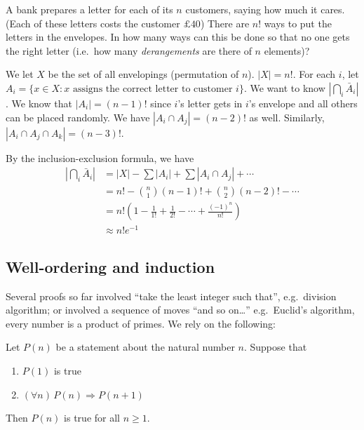 \documentclass[a4paper]{article}
\begin{document}
\begin{eg}
  A bank prepares a letter for each of its $n$ customers, saying how much it cares. (Each of these letters costs the customer $\pounds 40$) There are $n!$ ways to put the letters in the envelopes. In how many ways can this be done so that no one gets the right letter (i.e.\ how many \emph{derangements} are there of $n$ elements)?

  We let $X$ be the set of all envelopings (permutation of $n$). $|X| = n!$. For each $i$, let $A_i = \{x\in X: x \text{ assigns the correct letter to customer }i\}$. We want to know $|\bigcap_i \bar A_i|$. We know that $|A_i| = (n - 1)!$ since $i$'s letter gets in $i$'s envelope and all others can be placed randomly. We have $|A_i\cap A_j| = (n - 2)!$ as well. Similarly, $|A_i\cap A_j \cap A_k| = (n - 3)!$.

  By the inclusion-exclusion formula, we have
  \begin{align*}
    \left|\bigcap_i \bar A_i\right| &= |X| - \sum |A_i| + \sum |A_i\cap A_j| + \cdots\\
    &= n! - \binom{n}{1}(n - 1)! + \binom{n}{2}(n - 2)! - \cdots\\
    &= n!\left(1 - \frac{1}{1!} + \frac{1}{2!} - \cdots + \frac{(-1)^n}{n!}\right)\\
    &\approx n! e^{-1}
  \end{align*}
\end{eg}
\subsection{Well-ordering and induction}
Several proofs so far involved ``take the least integer such that'', e.g.\ division algorithm; or involved a sequence of moves ``and so on\ldots'' e.g.\ Euclid's algorithm, every number is a product of primes. We rely on the following:
\begin{thm}
  Let $P(n)$ be a statement about the natural number $n$. Suppose that
  \begin{enumerate}
    \item $P(1)$ is true
    \item $(\forall n)\,P(n)\Rightarrow P(n + 1)$
  \end{enumerate}
  Then $P(n)$ is true for all $n\geq 1$.
\end{thm}
\end{document}
